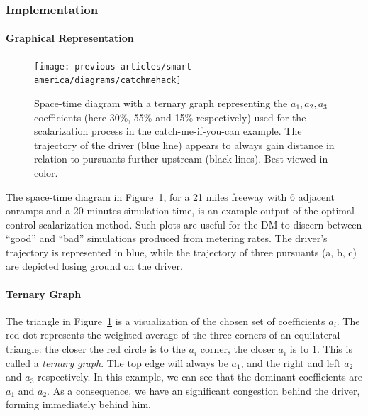 \subsubsection{Implementation}
\paragraph{Graphical Representation}
\begin{figure}[t]
\centering
  \texttt{[image: previous-articles/smart-america/diagrams/catchmehack]}
\caption[Space-time diagram with a ternary graph representing the $a_1,a_2,a_3$ coefficients (here 30\%, 55\% and 15\% respectively) used for the scalarization process in the catch-me-if-you-can example.  The trajectory of the driver (blue line) appears to always gain distance in relation to pursuants further upstream (black lines).]{Space-time diagram with a ternary graph representing the $a_1,a_2,a_3$ coefficients (here 30\%, 55\% and 15\% respectively) used for the scalarization process in the catch-me-if-you-can example.  The trajectory of the driver (blue line) appears to always gain distance in relation to pursuants further upstream (black lines). Best viewed in color.}
\label{fig:catchmeOverview}
\end{figure}
The space-time diagram in Figure~\ref{fig:catchmeOverview}, for a 21 miles freeway with $6$ adjacent onramps and a 20 minutes simulation time, is an example output of the optimal control scalarization method. Such plots are useful for the DM to discern between ``good'' and ``bad'' simulations produced from metering rates.  The driver's trajectory is represented in blue, while the trajectory of three pursuants (a, b, c) are depicted losing ground on the driver.
\paragraph{Ternary Graph}
The triangle in Figure~\ref{fig:catchmeOverview} is a visualization of the chosen set of coefficients $a_i$. The red dot represents the weighted average of the three corners of an equilateral triangle: the closer the red circle is to the $a_i$ corner, the closer $a_i$ is to $1$. This is called a \emph{ternary graph}. The top edge will always be $a_1$, and the right and left $a_2$ and $a_3$ respectively. In this example, we can see that the dominant coefficients are $a_1$ and $a_2$. As a consequence, we have an significant congestion behind the driver, forming immediately behind him.
